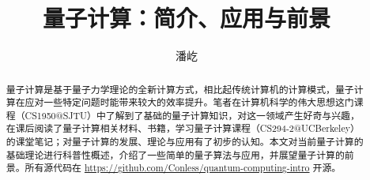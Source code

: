\documentclass[a4paper, 12pt]{ctexart}
\begin{document}
\title{量子计算：简介、应用与前景}
\author{潘屹}
\date{}

\maketitle

\begin{abstract}
量子计算是基于量子力学理论的全新计算方式，相比起传统计算机的计算模式，量子计算在应对一些特定问题时能带来较大的效率提升。笔者在计算机科学的伟大思想这门课程（CS1950@SJTU）中了解到了基础的量子计算知识，对这一领域产生好奇与兴趣，在课后阅读了量子计算相关材料、书籍，学习量子计算课程（CS294-2@UCBerkeley）的课堂笔记；对量子计算的发展、理论与应用有了初步的认知。本文对当前量子计算的基础理论进行科普性概述，介绍了一些简单的量子算法与应用，并展望量子计算的前景。所有源代码在 \href{https://github.com/Conless/quantum-computing-intro}{https://github.com/Conless/quantum-computing-intro} 开源。
\end{abstract}

\tableofcontents







\end{document}
